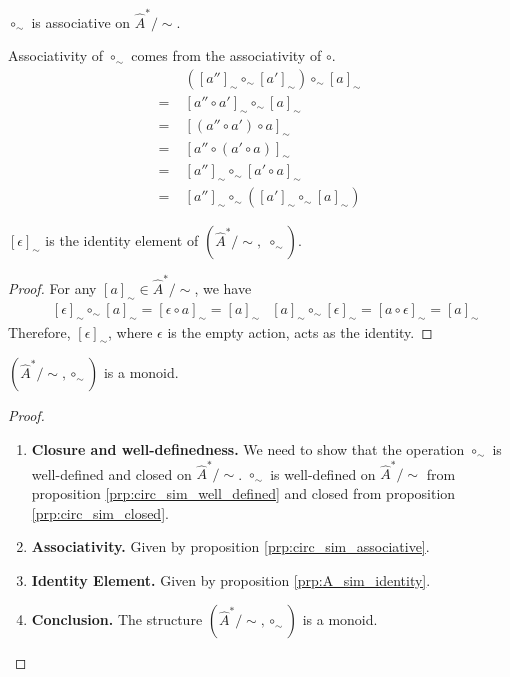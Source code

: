 \begin{propositionE}\label{prp:circ_sim_associative}
    $\circ_{\sim}$ is associative on $\hat{A}^{\ast}/\sim$.
\end{propositionE}
\begin{proofE}
Associativity of $\circ_{\sim}$ comes from the associativity of $\circ$.
\begin{align}
          & ([a'']_{\sim} \circ_{\sim} [a']_{\sim}) \circ_{\sim} [a]_{\sim} \\
      = \; & [a'' \circ a']_{\sim} \circ_{\sim} [a]_{\sim}                 \\
      = \; & [ (a'' \circ a') \circ a ]_{\sim}                               \\
      = \; & [ a'' \circ (a' \circ a) ]_{\sim}                               \\
      = \; & [a'']_{\sim} \circ_{\sim} [a' \circ a]_{\sim}                   \\
      = \; & [a'']_{\sim} \circ_{\sim} ([a']_{\sim} \circ_{\sim} [a]_{\sim})
  \end{align}
\end{proofE}


\begin{proposition}\label{prp:A_sim_identity}
    $[\epsilon]_{\sim}$ is the identity element of $(\hat{A}^{\ast}/\sim, \; \circ_{\sim})$.
\end{proposition}
\begin{proof}
For any $[a]_{\sim} \in \hat{A}^{\ast}/\sim$, we have
\begin{align}
   & [\epsilon]_{\sim} \circ_{\sim} [a]_{\sim} = [\epsilon \circ a]_{\sim} = [a]_{\sim}
   & [a]_{\sim} \circ_{\sim} [\epsilon]_{\sim} = [a \circ \epsilon]_{\sim} = [a]_{\sim}
\end{align}
Therefore, $[\epsilon]_{\sim}$, where $\epsilon$ is the empty action, acts as the identity.
\end{proof}


\begin{proposition}\label{prp:A_sim_is_monoid}
	$(\hat{A}^{\ast}/\sim, \circ_{\sim})$ is a monoid.
\end{proposition}
\begin{proof}
	\begin{enumerate}[(1)]
		\item \textbf{Closure and well-definedness.}
		      We need to show that the operation $\circ_{\sim}$ is well-defined and closed on $\hat{A}^{\ast}/\sim$.
		      $\circ_{\sim}$ is well-defined on $\hat{A}^{\ast}/\sim$ from proposition \ref{prp:circ_sim_well_defined} and closed from proposition \ref{prp:circ_sim_closed}.

		\item \textbf{Associativity.}
            Given by proposition \ref{prp:circ_sim_associative}.

		\item \textbf{Identity Element.}
		Given by proposition \ref{prp:A_sim_identity}.

		\item \textbf{Conclusion.}
		      The structure $(\hat{A}^{\ast}/\sim, \circ_{\sim})$ is a monoid.
	\end{enumerate}
\end{proof}

